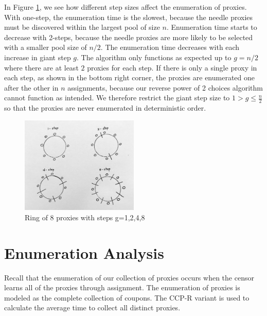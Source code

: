 In Figure \ref{fig:8ring}, we see how different step sizes affect the enumeration of proxies. With one-step, the enumeration time is the slowest, because the needle proxies must be discovered within the largest pool of size $n$. Enumeration time starts to decrease with 2-steps, because the needle proxies are more likely to be selected with a smaller pool size of $n/2$. The enumeration time decreases with each increase in giant step $g$. The algorithm only functions as expected up to $g=n/2$ where there are at least $2$ proxies for each step. If there is only a single proxy in each step, as shown in the bottom right corner, the proxies are enumerated one after the other in $n$ assignments, because our reverse power of 2 choices algorithm cannot function as intended. We therefore restrict the giant step size to $1>g\leq \frac{n}{2}$ so that the proxies are never enumerated in deterministic order.

\begin{figure}[h!]
\centering
     \includegraphics[width=0.5\textwidth]{fig/8_ring.png}
    \caption{Ring of 8 proxies with steps g=1,2,4,8}

    \label{fig:8ring}
\end{figure}
 
\section{Enumeration Analysis}
\label{sec:enum}

Recall that the enumeration of our collection of proxies occurs when the censor learns all of the proxies through assignment. The enumeration of proxies is modeled as the complete collection of coupons. The \ac{CCP-R} variant is used to calculate the average time to collect all distinct proxies.
 

